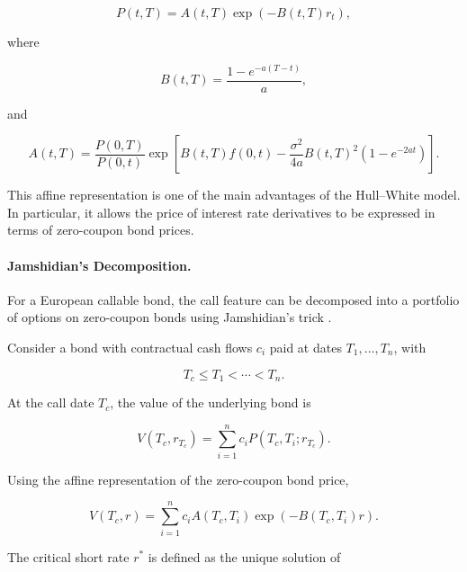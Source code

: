 \documentclass{article}
\begin{document}
\begin{equation}
    P(t,T)
    =
    A(t,T)
    \exp\left(
        -B(t,T)r_t
    \right),
\end{equation}

where

\begin{equation}
    B(t,T)
    =
    \frac{1-e^{-a(T-t)}}{a},
\end{equation}

and

\begin{equation}
    A(t,T)
    =
    \frac{P(0,T)}{P(0,t)}
    \exp
    \left[
        B(t,T)f(0,t)
        -
        \frac{\sigma^2}{4a}
        B(t,T)^2
        \left(
            1-e^{-2at}
        \right)
    \right].
\end{equation}

This affine representation is one of the main advantages of the
Hull--White model. In particular, it allows the price of interest
rate derivatives to be expressed in terms of zero-coupon bond
prices.


\paragraph{Jamshidian's Decomposition.}

For a European callable bond, the call feature can be decomposed
into a portfolio of options on zero-coupon bonds using
Jamshidian's trick \cite{Jashmidian}.

Consider a bond with contractual cash flows $c_i$ paid at dates
$T_1,\ldots,T_n$, with

\begin{equation}
    T_c \leq T_1 < \cdots < T_n.
\end{equation}

At the call date $T_c$, the value of the underlying bond is

\begin{equation}
    V(T_c,r_{T_c})
    =
    \sum_{i=1}^{n}
    c_i P(T_c,T_i;r_{T_c}).
\end{equation}

Using the affine representation of the zero-coupon bond price,

\begin{equation}
    V(T_c,r)
    =
    \sum_{i=1}^{n}
    c_i
    A(T_c,T_i)
    \exp
    \left(
        -B(T_c,T_i)r
    \right).
\end{equation}

The critical short rate $r^*$ is defined as the unique solution of
\end{document}
